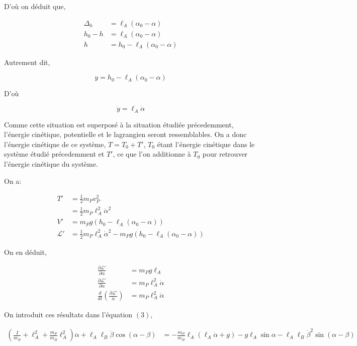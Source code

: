 \documentclass[10pt]{article}
\begin{document}
D'où on déduit que,

\begin{align*}
 \Delta_h &= \ell_A(\alpha_0-\alpha) \\
 h_0 - h &= \ell_A(\alpha_0-\alpha) \\
 h &= h_0 - \ell_A(\alpha_0-\alpha)
\end{align*}

Autrement dit,

\begin{equation}
 y = h_0 - \ell_A(\alpha_0-\alpha)
\end{equation}

D'où

$$ \dot{y} = \ell_A\dot{\alpha}$$

Comme cette situation est superposé à la situation étudiée précedemment, l'énergie cinétique, potentielle et le lagrangien seront
ressemblables. On a donc l'énergie cinétique de ce système, $T = T_0 + T'$, $T_0$ étant l'énergie cinétique dans le système étudié
précedemment et $T'$, ce que l'on additionne à $T_0$ pour retrouver l'énergie cinétique du système.

On a:

\begin{align*}
 T' &= \frac12m_Pv_P^2 \\
    &= \frac12m_P\ell_A^2\dot{\alpha}^2 \\
 V' &= m_Pg\left(h_0-\ell_A(\alpha_0-\alpha)\right) \\
 \mathcal{L}' &= \frac12m_P\ell_A^2\dot{\alpha}^2 - m_Pg\left(h_0-\ell_A(\alpha_0-\alpha)\right)
\end{align*}

On en déduit,

\begin{align*}
 \frac{\partial \mathcal{L}'}{\partial \alpha} &= m_Pg\ell_A \\
 \frac{\partial \mathcal{L}'}{\partial \dot{\alpha}} &= m_P\ell_A^2\dot{\alpha} \\
 \frac{d}{dt}\left(\frac{\partial \mathcal{L}'}{\dot{\alpha}}\right) &= m_P\ell_A^2\ddot{\alpha} 
\end{align*}

On introduit ces résultats dans l'équation $(3)$,

\begin{align}
  \left(\frac{I}{m_B}+\ell_A^2+\frac{m_P}{m_B}\ell_A^2\right)\ddot{\alpha} + \ell_A\ell_B\ddot{\beta}\cos{(\alpha-\beta)} &= -\frac{m_P}{m_B}\ell_A\left(\ell_A\dot{\alpha} + g\right)-g\ell_A\sin{\alpha}-\ell_A\ell_B\dot{\beta}^2\sin{(\alpha-\beta)}
\end{align}
\end{document}

